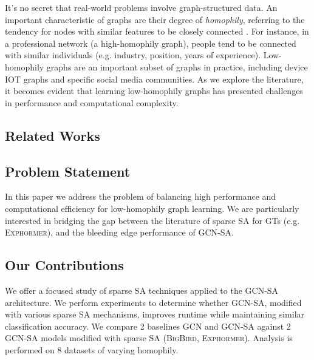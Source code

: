 It's no secret that
real-world problems involve graph-structured data.
An important characteristic of graphs are their 
degree of \emph{homophily},
referring to the tendency for nodes with
similar features to be closely connected \citep{li2023homogcl}.
For instance, in a professional network
(a high-homophily graph),
people tend to be connected with similar individuals
(e.g. industry, position, years of experience).
Low-homophily graphs are an important subset of graphs in
practice, including device IOT graphs and 
specific social media communities.
As we explore the literature,
it becomes evident that learning low-homophily graphs
has presented challenges 
in performance and computational complexity.

\subsection{Related Works}


\subsection{Problem Statement}

In this paper we address the problem of balancing
high performance and computational efficiency
for low-homophily graph learning.
We are particularly interested in 
bridging the gap between the literature of
sparse SA for GTs (e.g. \textsc{Exphormer}),
and the bleeding edge performance of \textsc{GCN-SA}.

\subsection{Our Contributions}

We offer a focused study of sparse SA
techniques applied to the \textsc{GCN-SA} architecture.
We perform experiments to determine 
whether GCN-SA, modified 
with various sparse SA mechanisms,
improves runtime while
maintaining similar classification accuracy.
We compare 2 baselines GCN and GCN-SA against 
2 GCN-SA models modified with sparse SA 
(\textsc{BigBird}, \textsc{Exphormer}).
Analysis is performed on 8 datasets of varying homophily.
